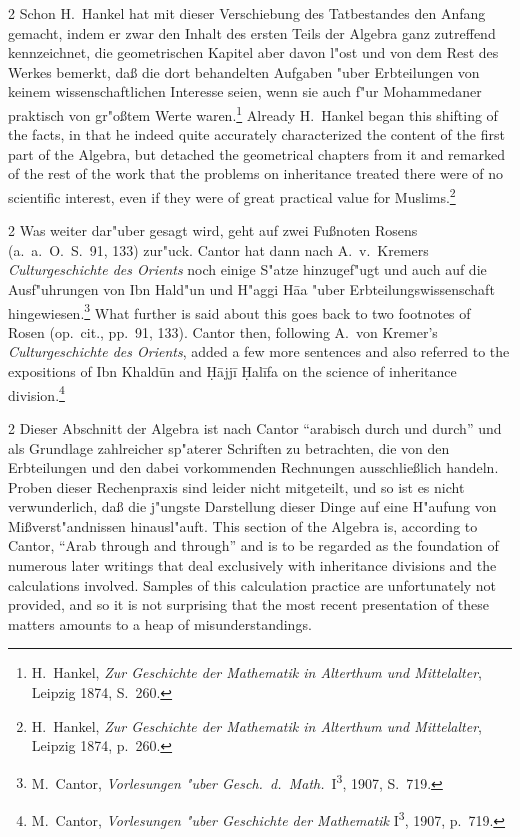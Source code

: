 \documentclass[10pt,a4paper]{article}
\renewcommand{\switchcolumn}{\syncronize\nointerlineskip\columnbreak}
\newcommand{\alf}{\=a}
\newcommand{\enquote}[1]{``#1''}
\begin{document}
\begin{paracol}{2}
Schon H.\ Hankel hat mit dieser Verschiebung des Tatbestandes den Anfang gemacht, indem er zwar den Inhalt des ersten Teils der Algebra ganz zutreffend kennzeichnet, die geometrischen Kapitel aber davon l"ost und von dem Rest des Werkes bemerkt, da\ss{} die dort behandelten Aufgaben "uber Erbteilungen von keinem wissenschaftlichen Interesse seien, wenn sie auch f"ur Mohammedaner praktisch von gr"o\ss{}tem Werte waren.\footnote{H.\ Hankel, \textit{Zur Geschichte der Mathematik in Alterthum und Mittelalter}, Leipzig 1874, S.\ 260.}
\switchcolumn
Already H.\ Hankel began this shifting of the facts, in that he indeed quite accurately characterized the content of the first part of the Algebra, but detached the geometrical chapters from it and remarked of the rest of the work that the problems on inheritance treated there were of no scientific interest, even if they were of great practical value for Muslims.\footnote{H.\ Hankel, \textit{Zur Geschichte der Mathematik in Alterthum und Mittelalter}, Leipzig 1874, p.\ 260.}
\end{paracol}

\begin{paracol}{2}
Was weiter dar"uber gesagt wird, geht auf zwei Fu\ss{}noten Rosens (a.\ a.\ O.\ S.\ 91, 133) zur"uck. Cantor hat dann nach A.\ v.\ Kremers \textit{Culturgeschichte des Orients} noch einige S"atze hinzugef"ugt und auch auf die Ausf"uhrungen von Ibn Hald"un und H"aggi H\alf{a} "uber Erbteilungswissenschaft hingewiesen.\footnote{M.\ Cantor, \textit{Vorlesungen "uber Gesch.\ d.\ Math.}\ I\textsuperscript{3}, 1907, S.\ 719.}
\switchcolumn
What further is said about this goes back to two footnotes of Rosen (op.\ cit., pp.\ 91, 133). Cantor then, following A.\ von Kremer's \textit{Culturgeschichte des Orients}, added a few more sentences and also referred to the expositions of Ibn Khald\=un and \d{H}\=ajj\={i} \d{H}al\={i}fa on the science of inheritance division.\footnote{M.\ Cantor, \textit{Vorlesungen "uber Geschichte der Mathematik} I\textsuperscript{3}, 1907, p.\ 719.}
\end{paracol}

\begin{paracol}{2}
Dieser Abschnitt der Algebra ist nach Cantor \enquote{arabisch durch und durch} und als Grundlage zahlreicher sp"aterer Schriften zu betrachten, die von den Erbteilungen und den dabei vorkommenden Rechnungen ausschlie\ss{}lich handeln. Proben dieser Rechenpraxis sind leider nicht mitgeteilt, und so ist es nicht verwunderlich, da\ss{} die j"ungste Darstellung dieser Dinge auf eine H"aufung von Mi\ss{}verst"andnissen hinausl"auft.
\switchcolumn
This section of the Algebra is, according to Cantor, ``Arab through and through'' and is to be regarded as the foundation of numerous later writings that deal exclusively with inheritance divisions and the calculations involved. Samples of this calculation practice are unfortunately not provided, and so it is not surprising that the most recent presentation of these matters amounts to a heap of misunderstandings.
\end{paracol}
\end{document}
